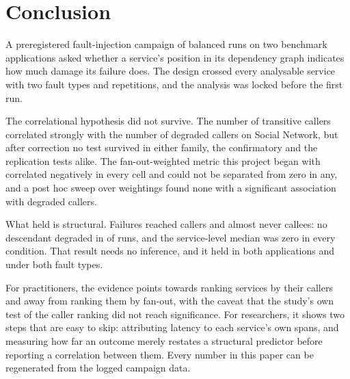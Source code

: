 \section{Conclusion}
\label{sec:conclusion}

A preregistered fault-injection campaign of  balanced runs on two
benchmark applications asked whether a service's position in its dependency graph indicates how
much damage its failure does. The design crossed every analysable service with two fault types
and  repetitions, and the analysis was locked before the first run.

The correlational hypothesis did not survive. The number of transitive callers correlated
strongly with the number of degraded callers on Social Network, but after correction no test
survived in either family, the  confirmatory and the
 replication tests alike. %
The fan-out-weighted metric this project began with correlated negatively in every cell
and could not be separated from zero in any, %
and a post hoc sweep over  weightings found none with a significant
association with degraded callers. %

What held is structural. Failures reached callers and almost never callees: no descendant
degraded in  of  runs, and the
service-level median was zero in every condition. %
That result needs no inference, and it held in both applications and under both fault types.

For practitioners, the evidence points towards ranking services by their callers and away from
ranking them by fan-out, with the caveat that the study's own test of the caller ranking did not
reach significance. For researchers, it shows two steps that are easy to skip: attributing
latency to each service's own spans, and measuring how far an outcome merely restates a
structural predictor before reporting a correlation between them. Every number in this paper can
be regenerated from the logged campaign data.
